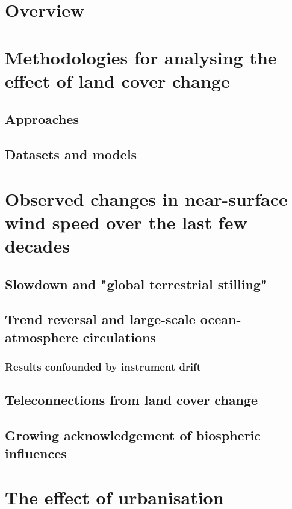 \section{Overview}

\section{Methodologies for analysing the effect of land cover change}

\subsection{Approaches}

\subsection{Datasets and models}

\section{Observed changes in near-surface wind speed over the last few decades}

\subsection{Slowdown and "global terrestrial stilling"}

\subsection{Trend reversal and large-scale ocean-atmosphere circulations}

\subsubsection{Results confounded by instrument drift}

\subsection{Teleconnections from land cover change}

\subsection{Growing acknowledgement of biospheric influences}

\section{The effect of urbanisation}

